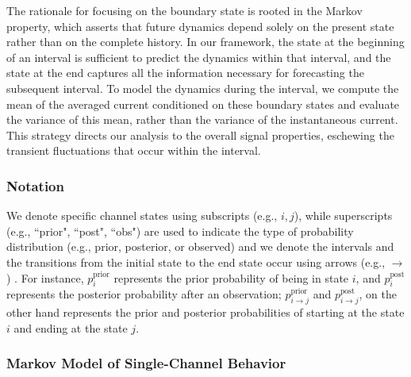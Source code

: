 \documentclass[pdflatex,sn-nature]{sn-jnl}%
\begin{document}
The rationale for focusing on the boundary state is rooted in the Markov property, which asserts that future dynamics depend solely on the present state rather than on the complete history. In our framework, the state at the beginning of an interval is sufficient to predict the dynamics within that interval, and the state at the end captures all the information necessary for forecasting the subsequent interval. To model the dynamics during the interval, we compute the mean of the averaged current conditioned on these boundary states and evaluate the variance of this mean, rather than the variance of the instantaneous current. This strategy directs our analysis to the overall signal properties, eschewing the transient fluctuations that occur within the interval.

\subsubsection{Notation}
We denote specific channel states using subscripts (e.g., \( i, j \)), while superscripts (e.g., ``prior", ``post", ``obs") are used to indicate the type of probability distribution (e.g., prior, posterior, or observed) and we denote the intervals and the transitions from the initial state to the end state occur using arrows (e.g., $\rightarrow$) . For instance, \( p_i^{\text{prior}} \) represents the prior probability of being in state \( i \), and \( p_i^{\text{post}} \) represents the posterior probability after an observation; $p_{i \rightarrow j}^{\text{prior}}$ and $p_{i \rightarrow j}^{\text{post}}$, on the other hand represents the prior  and posterior probabilities of starting at the state $i$ and ending at the state $j$. 

\subsubsection{Markov Model of Single-Channel Behavior}\label{SingleChannel Behavior}
\end{document}
